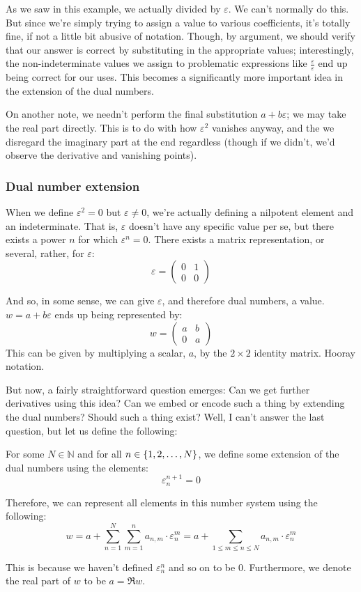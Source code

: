 As we saw in this example, we actually divided by $\varepsilon$. We can't normally do this. But since we're simply trying to assign a value to various coefficients, it's totally fine, if not a little bit abusive of notation. Though, by argument, we should verify that our answer is correct by substituting in the appropriate values; interestingly, the non-indeterminate values we assign to problematic expressions like $\frac{\varepsilon}{\varepsilon}$ end up being correct for our uses. This becomes a significantly more important idea in the extension of the dual numbers.

On another note, we needn't perform the final substitution $a+b\varepsilon$; we may take the real part directly. This is to do with how $\varepsilon^2$ vanishes anyway, and the we disregard the imaginary part at the end regardless (though if we didn't, we'd observe the derivative and vanishing points).

\subsubsection{Dual number extension}
When we define $\varepsilon^2=0$ but $\varepsilon\neq 0$, we're actually defining a nilpotent element and an indeterminate. That is, $\varepsilon$ doesn't have any specific value per se, but there exists a power $n$ for which $\varepsilon^n=0$. There exists a matrix representation, or several, rather, for $\varepsilon$:
$$
    \varepsilon=\begin{pmatrix}
        0 & 1 \\
        0 & 0
    \end{pmatrix}
$$

And so, in some sense, we can give $\varepsilon$, and therefore dual numbers, a value. $w=a+b\varepsilon$ ends up being represented by:
$$
    w=\begin{pmatrix}
        a & b \\
        0 & a
    \end{pmatrix}
$$
This can be given by multiplying a scalar, $a$, by the $2\times 2$ identity matrix. Hooray notation.

But now, a fairly straightforward question emerges: Can we get further derivatives using this idea? Can we embed or encode such a thing by extending the dual numbers? Should such a thing exist? Well, I can't answer the last question, but let us define the following:

\begin{theorem}
    For some $N\in\mathbb{N}$ and for all $n\in\{1,2,\dots,N\}$, we define some extension of the dual numbers using the elements:
    $$
        \varepsilon_{n}^{n+1}=0
    $$

    Therefore, we can represent all elements in this number system using the following:
    $$
        w=a+\sum_{n=1}^{N}{\sum_{m=1}^{n}{a_{n,m}\cdot\varepsilon_{n}^{m}}}=a+\sum_{1\leq m\leq n\leq N}{a_{n,m}\cdot\varepsilon_{n}^{m}}
    $$

    This is because we haven't defined $\varepsilon_{n}^{n}$ and so on to be $0$. Furthermore, we denote the real part of $w$ to be $a=\Re{w}$.
\end{theorem}

